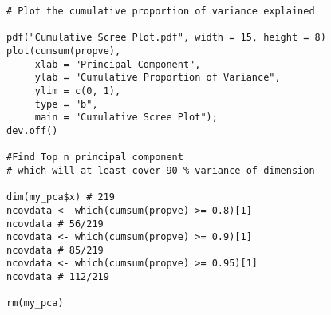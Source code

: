 \begin{verbatim}
# Plot the cumulative proportion of variance explained

pdf("Cumulative Scree Plot.pdf", width = 15, height = 8) 
plot(cumsum(propve),
     xlab = "Principal Component",
     ylab = "Cumulative Proportion of Variance",
     ylim = c(0, 1), 
     type = "b",
     main = "Cumulative Scree Plot");
dev.off()

#Find Top n principal component
# which will at least cover 90 % variance of dimension

dim(my_pca$x) # 219
ncovdata <- which(cumsum(propve) >= 0.8)[1] 
ncovdata # 56/219
ncovdata <- which(cumsum(propve) >= 0.9)[1] 
ncovdata # 85/219
ncovdata <- which(cumsum(propve) >= 0.95)[1] 
ncovdata # 112/219

rm(my_pca)
\end{verbatim}

